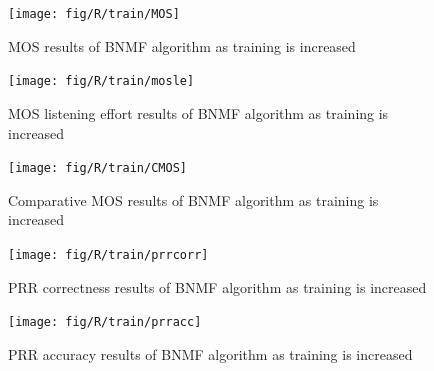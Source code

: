 \begin{figure}[p]
\noindent \begin{centering}
\texttt{[image: fig/R/train/MOS]}
\par\end{centering}

\protect\caption{\label{fig:vary-train-mos}\acs{MOS} results of \acs{BNMF} algorithm
as training is increased}
\end{figure}


\begin{figure}[p]
\noindent \begin{centering}
\texttt{[image: fig/R/train/mosle]}
\par\end{centering}

\protect\caption{\label{fig:vary-train-mosle}\acs{MOS} listening effort results of
\acs{BNMF} algorithm as training is increased}
\end{figure}


\begin{figure}[p]
\noindent \begin{centering}
\texttt{[image: fig/R/train/CMOS]}
\par\end{centering}

\protect\caption{\label{fig:vary-train-cmos}Comparative \acs{MOS} results of \acs{BNMF}
algorithm as training is increased}
\end{figure}


\begin{figure}[p]
\noindent \begin{centering}
\texttt{[image: fig/R/train/prrcorr]}
\par\end{centering}

\protect\caption{\label{fig:vary-train-prrcorr} \acs{PRR} correctness results of
\acs{BNMF} algorithm as training is increased}
\end{figure}


\begin{figure}[p]
\noindent \begin{centering}
\texttt{[image: fig/R/train/prracc]}
\par\end{centering}

\protect\caption{\label{fig:vary-train-prracc} \acs{PRR} accuracy results of \acs{BNMF}
algorithm as training is increased}
\end{figure}


